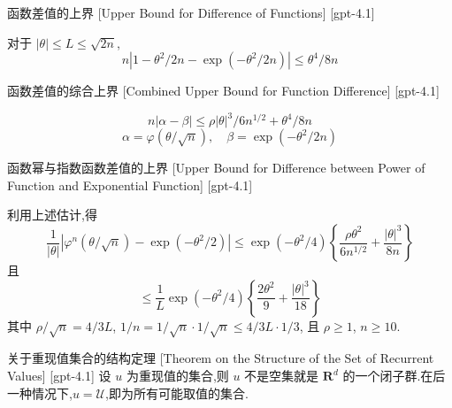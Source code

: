 \documentclass[UTF8]{ctexart}
\begin{document}
    
    
    \begin{ppt}
        {函数差值的上界}
        [Upper Bound for Difference of Functions]
        [gpt-4.1]
        
对于 $|\theta| \leq L \leq \sqrt{2n}$,
\[
n|1 - \theta^2 / 2n - \exp(-\theta^2 / 2n)| \leq \theta^4 / 8n
\]

    \end{ppt}
    
    
    
    \begin{ppt}
        {函数差值的综合上界}
        [Combined Upper Bound for Function Difference]
        [gpt-4.1]
        
\[
n|\alpha - \beta| \leq \rho |\theta|^3 / 6 n^{1/2} + \theta^4 / 8n
\]
\[
\alpha = \varphi(\theta/{\sqrt{n}}), \quad \beta = \exp(-\theta^2 / 2n)
\]

    \end{ppt}
    
    
    
    \begin{thm}
        {函数幂与指数函数差值的上界}
        [Upper Bound for Difference between Power of Function and Exponential Function]
        [gpt-4.1]
        
利用上述估计,得
\[
\frac{1}{|\theta|} |\varphi^n(\theta/\sqrt{n}) - \exp(-\theta^2 / 2)| \leq \exp(-\theta^2 / 4) \left\{ \frac{\rho \theta^2}{6 n^{1/2}} + \frac{|\theta|^3}{8 n} \right\}
\]
且
\[
\leq \frac{1}{L} \exp(-\theta^2 / 4) \left\{ \frac{2\theta^2}{9} + \frac{|\theta|^3}{18} \right\}
\]
其中 $\rho / \sqrt{n} = 4 / 3L$, $1/n = 1/\sqrt{n} \cdot 1/\sqrt{n} \leq 4 / 3L \cdot 1 / 3$, 且 $\rho \geq 1$, $n \geq 10$.

    \end{thm}
    
    
    
    \begin{thm}
        {关于重现值集合的结构定理}
        [Theorem on the Structure of the Set of Recurrent Values]
        [gpt-4.1]
        设 $
u$ 为重现值的集合,则 $
u$ 不是空集就是 $\mathbf{R}^d$ 的一个闭子群.在后一种情况下,$
u = \mathcal{U}$,即为所有可能取值的集合.
    \end{thm}
    
\end{document}
